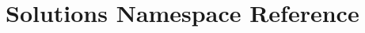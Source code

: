 \hypertarget{namespaceSolutions}{}\section{Solutions Namespace Reference}
\label{namespaceSolutions}
